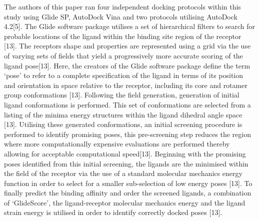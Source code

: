 \documentclass[
]{article}
\begin{document}
The authors of this paper ran four independent docking protocols within
this study using Glide SP, AutoDock Vina and two protocols utilising
AutoDock 4.2{[}5{]}. The Glide software package utilises a set of
hierarchical filters to search for probable locations of the ligand
within the binding site region of the receptor {[}13{]}. The receptors
shape and properties are represented using a grid via the use of varying
sets of fields that yield a progressively more accurate scoring of the
ligand pose{[}13{]}. Here, the creators of the Glide software package
define the term `pose' to refer to a complete specification of the
ligand in terms of its position and orientation in space relative to the
receptor, including its core and rotamer group conformations {[}13{]}.
Following the field generation, generation of initial ligand
conformations is performed. This set of conformations are selected from
a listing of the minima energy structures within the ligand dihedral
angle space {[}13{]}. Utilising these generated conformations, an
initial screening procedure is performed to identify promising poses,
this pre-screening step reduces the region where more computationally
expensive evaluations are performed thereby allowing for acceptable
computational speed{[}13{]}. Beginning with the promising poses
identified from this initial screening, the ligands are the minimised
within the field of the receptor via the use of a standard molecular
mechanics energy function in order to select for a smaller sub-selection
of low energy poses {[}13{]}. To finally predict the binding affinity
and order the screened ligands, a combination of `GlideScore', the
ligand-receptor molecular mechanics energy and the ligand strain energy
is utilised in order to identify correctly docked poses {[}13{]}.

\hypertarget{section}{%
\section*{}\label{section}}
\end{document}
